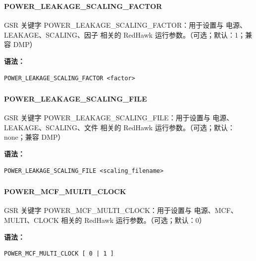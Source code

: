 \subsubsection{}
\paragraph*{POWER_LEAKAGE_SCALING_FACTOR}

GSR 关键字 POWER_LEAKAGE_SCALING_FACTOR：用于设置与 电源、LEAKAGE、SCALING、因子 相关的 RedHawk 运行参数。（可选；默认：1；兼容 DMP）

\textbf{语法：}
\begin{lstlisting}
POWER_LEAKAGE_SCALING_FACTOR <factor>
\end{lstlisting}

\subsubsection{}
\paragraph*{POWER_LEAKAGE_SCALING_FILE}

GSR 关键字 POWER_LEAKAGE_SCALING_FILE：用于设置与 电源、LEAKAGE、SCALING、文件 相关的 RedHawk 运行参数。（可选；默认：none；兼容 DMP）

\textbf{语法：}
\begin{lstlisting}
POWER_LEAKAGE_SCALING_FILE <scaling_filename>
\end{lstlisting}

\subsubsection{}
\paragraph*{POWER_MCF_MULTI_CLOCK}

GSR 关键字 POWER_MCF_MULTI_CLOCK：用于设置与 电源、MCF、MULTI、CLOCK 相关的 RedHawk 运行参数。（可选；默认：0）

\textbf{语法：}
\begin{lstlisting}
POWER_MCF_MULTI_CLOCK [ 0 | 1 ]
\end{lstlisting}

\subsubsection{}

